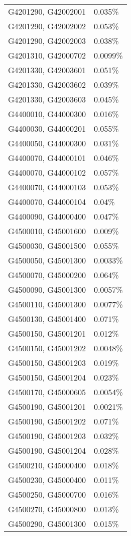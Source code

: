 \begin{longtable}[]{@{}ll@{}}
G4201290, G42002001 & 0.035\% \\
G4201290, G42002002 & 0.053\% \\
G4201290, G42002003 & 0.038\% \\
G4201310, G42000702 & 0.0099\% \\
G4201330, G42003601 & 0.051\% \\
G4201330, G42003602 & 0.039\% \\
G4201330, G42003603 & 0.045\% \\
G4400010, G44000300 & 0.016\% \\
G4400030, G44000201 & 0.055\% \\
G4400050, G44000300 & 0.031\% \\
G4400070, G44000101 & 0.046\% \\
G4400070, G44000102 & 0.057\% \\
G4400070, G44000103 & 0.053\% \\
G4400070, G44000104 & 0.04\% \\
G4400090, G44000400 & 0.047\% \\
G4500010, G45001600 & 0.009\% \\
G4500030, G45001500 & 0.055\% \\
G4500050, G45001300 & 0.0033\% \\
G4500070, G45000200 & 0.064\% \\
G4500090, G45001300 & 0.0057\% \\
G4500110, G45001300 & 0.0077\% \\
G4500130, G45001400 & 0.071\% \\
G4500150, G45001201 & 0.012\% \\
G4500150, G45001202 & 0.0048\% \\
G4500150, G45001203 & 0.019\% \\
G4500150, G45001204 & 0.023\% \\
G4500170, G45000605 & 0.0054\% \\
G4500190, G45001201 & 0.0021\% \\
G4500190, G45001202 & 0.071\% \\
G4500190, G45001203 & 0.032\% \\
G4500190, G45001204 & 0.028\% \\
G4500210, G45000400 & 0.018\% \\
G4500230, G45000400 & 0.011\% \\
G4500250, G45000700 & 0.016\% \\
G4500270, G45000800 & 0.013\% \\
G4500290, G45001300 & 0.015\% \\

\end{longtable}
